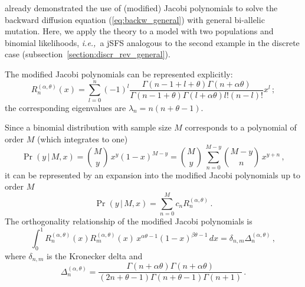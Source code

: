 \documentclass[preprint]{elsarticle}
\newcommand\given{{\,|\,}}
\newcommand\ie{{\it i.e.,}}
\begin{document}
\citet{Song12} already demonstrated the use of (modified) Jacobi polynomials to solve the backward diffusion equation (\ref{eq:backw_general}) with general bi-allelic mutation. Here, we apply the theory to a model with two populations and binomial likelihoods, \ie\ a jSFS analogous to the second example in the discrete case (subsection~\ref{section:discr_rev_general}). 

The modified Jacobi polynomials can be represented explicitly:
\begin{equation}
  R_n^{(\alpha,\theta)}(x)=\sum_{l=0}^n(-1)^l\frac{\Gamma(n-1+l+\theta)\Gamma(n+\alpha\theta)}{\Gamma(n-1+\theta)\Gamma(l+\alpha\theta)l!(n-l)!}x^l\,;
\end{equation}
the corresponding eigenvalues are $\lambda_n=n(n+\theta-1)$. 

Since a binomial distribution with sample size $M$ corresponds to a polynomial of order $M$ (which integrates to one) 
\begin{equation}
\Pr(y\given M,x)=\binom{M}{y}\,x^{y}(1-x)^{M-y}
=\binom{M}{y}\,\sum_{n=0}^{M-y} \binom{M-y}{n}\,x^{y+n}\,,
\end{equation}
it can be represented by an expansion into the modified Jacobi polynomials up to order $M$
\begin{equation}
\Pr(y\given M,x)=\sum_{n=0}^M c_n R_n^{(\alpha,\theta)}\,.
\end{equation}
The orthogonality relationship of the modified Jacobi polynomials is
\begin{equation}
    \int_0^1 R_n^{(\alpha,\theta)}(x) R_m^{(\alpha,\theta)}(x)\, x^{\alpha\theta-1}(1-x)^{\beta\theta-1}\,dx=\delta_{n,m} \Delta_n^{(\alpha,\theta)}\,,
\end{equation}
where $\delta_{n,m}$ is the Kronecker delta and 
\begin{equation}
    \Delta_n^{(\alpha,\theta)}=\frac{\Gamma(n+\alpha\theta)\Gamma(n+\alpha\theta)}{(2n+\theta-1)\Gamma(n+\theta-1)\Gamma(n+1)}\,.
\end{equation}
\end{document}
